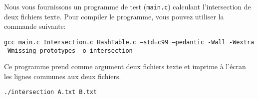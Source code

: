 \documentclass[a4paper,10pt]{article}
\begin{document}
Nous vous fournissons un programme de test (\texttt{main.c}) calculant l'intersection de deux fichiers texte.
Pour compiler le programme, vous pouvez utiliser la commande suivante:

{\small \texttt{gcc main.c Intersection.c HashTable.c --std=c99 --pedantic -Wall -Wextra -Wmissing-prototypes -o intersection}}

Ce programme prend comme argument deux fichiers texte et imprime à l'écran les lignes communes aux deux fichiers.

{\small \texttt{./intersection A.txt B.txt}}
\end{document}
